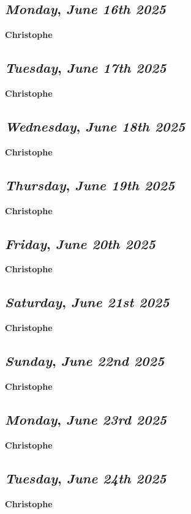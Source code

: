 \def\day{\textit{June 16th 2025}}
\def\weekday{\textit{Monday}}
\subsection*{\weekday, \day}
\textbf {Christophe}

\def\day{\textit{June 17th 2025}}
\def\weekday{\textit{Tuesday}}
\subsection*{\weekday, \day}
\textbf {Christophe}

\def\day{\textit{June 18th 2025}}
\def\weekday{\textit{Wednesday}}
\subsection*{\weekday, \day}
\textbf {Christophe}

\def\day{\textit{June 19th 2025}}
\def\weekday{\textit{Thursday}}
\subsection*{\weekday, \day}
\textbf {Christophe}

\def\day{\textit{June 20th 2025}}
\def\weekday{\textit{Friday}}
\subsection*{\weekday, \day}
\textbf {Christophe}

\def\day{\textit{June 21st 2025}}
\def\weekday{\textit{Saturday}}
\subsection*{\weekday, \day}
\textbf {Christophe}

\def\day{\textit{June 22nd 2025}}
\def\weekday{\textit{Sunday}}
\subsection*{\weekday, \day}
\textbf {Christophe}

\def\day{\textit{June 23rd 2025}}
\def\weekday{\textit{Monday}}
\subsection*{\weekday, \day}
\textbf {Christophe}

\def\day{\textit{June 24th 2025}}
\def\weekday{\textit{Tuesday}}
\subsection*{\weekday, \day}
\textbf {Christophe}

